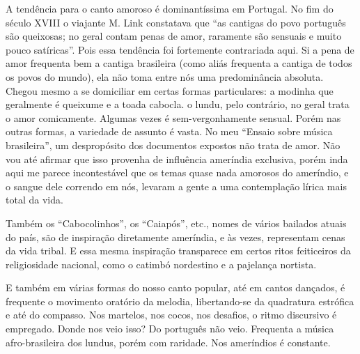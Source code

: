 A tendência para o canto amoroso é dominantíssima em Portugal. No fim do
século XVIII o viajante M. Link constatava que ``as cantigas do povo
português são queixosas; no geral contam penas de amor, raramente são
sensuais e muito pouco satíricas''. Pois essa tendência foi fortemente
contrariada aqui. Si a pena de amor frequenta bem a cantiga brasileira
(como aliás frequenta a cantiga de todos os povos do mundo), ela não
toma entre nós uma predominância absoluta. Chegou mesmo a se domiciliar
em certas formas particulares: a modinha que geralmente é queixume e a
toada cabocla. o lundu, pelo contrário, no geral trata o amor
comicamente. Algumas vezes é sem-vergonhamente sensual. Porém nas outras
formas, a variedade de assunto é vasta. No meu ``Ensaio sobre música
brasileira'', um despropósito dos documentos expostos não trata de amor.
Não vou até afirmar que isso provenha de influência ameríndia exclusiva,
porém inda aqui me parece incontestável que os temas quase nada amorosos
do ameríndio, e o sangue dele correndo em nós, levaram a gente a uma
contemplação lírica mais total da vida.

Também os ``Cabocolinhos'', os ``Caiapós'', etc., nomes de vários
bailados atuais do país, são de inspiração diretamente ameríndia, e às
vezes, representam cenas da vida tribal. E essa mesma inspiração
transparece em certos ritos feiticeiros da religiosidade nacional, como
o catimbó nordestino e a pajelança nortista.

E também em várias formas do nosso canto popular, até em cantos
dançados, é frequente o movimento oratório da melodia, libertando-se da
quadratura estrófica e até do compasso. Nos martelos, nos cocos, nos
desafios, o ritmo discursivo é empregado. Donde nos veio isso? Do
português não veio. Frequenta a música afro-brasileira dos lundus, porém
com raridade. Nos ameríndios é constante.

